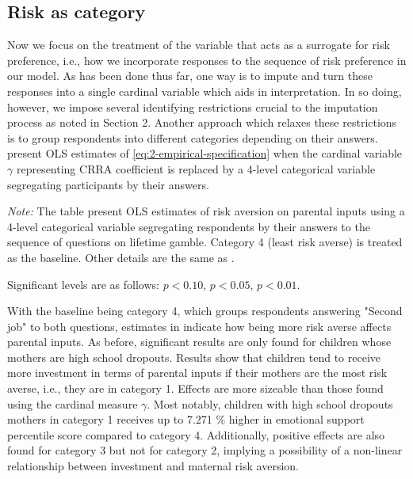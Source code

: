 \documentclass[]{article}
\begin{document}
\subsection{Risk as category}
Now we focus on the treatment of the variable that acts as a surrogate for risk preference, i.e., how we incorporate responses to the sequence of risk preference in our model. As has been done thus far, one way is to impute and turn these responses into a single cardinal variable which aids in interpretation. In so doing, however, we impose several identifying restrictions crucial to the imputation process as noted in Section 2. Another approach which relaxes these restrictions is to group respondents into different categories depending on their answers.  present OLS estimates of \eqref{eq:2-empirical-specification} when the cardinal variable $\gamma$ representing CRRA coefficient is replaced by a 4-level categorical variable segregating participants by their answers.

\pagebreak

\begin{ThreePartTable}
	\centering
	\setlength{\extrarowheight}{0.2em}
	\begin{TableNotes}[flushleft]\footnotesize
		\item \textit{Note:} The table present OLS estimates of risk aversion on parental inputs using a 4-level categorical variable segregating respondents by their answers to the sequence of questions on lifetime gamble. Category 4 (least risk averse) is treated as the baseline. Other details are the same as .
		\item Significant levels are as follows: \sym{*} \(p<0.10\), \sym{**} \(p<0.05\), \sym{***} \(p<0.01\).
	\end{TableNotes}
	
\end{ThreePartTable}

With the baseline being category 4, which groups respondents answering "Second job" to both questions, estimates in  indicate how being more risk averse affects parental inputs. As before, significant results are only found for children whose mothers are high school dropouts. Results show that children tend to receive more investment in terms of parental inputs if their mothers are the most risk averse, i.e., they are in category 1. Effects are more sizeable than those found using the cardinal measure $\gamma$. Most notably, children with high school dropouts mothers in category 1 receives up to 7.271 \% higher in emotional support percentile score compared to category 4. Additionally, positive effects are also found for category 3 but not for category 2, implying a possibility of a non-linear relationship between investment and maternal risk aversion.
\end{document}

